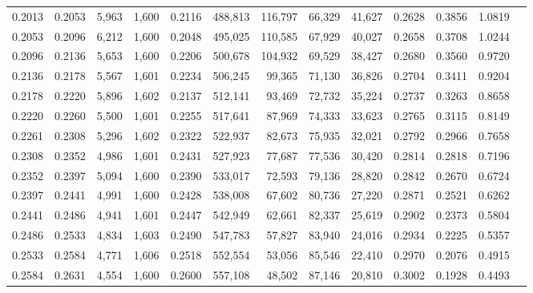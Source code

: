 \begin{tabular}{rrrrrrrrrrrrr}
0.2013 & 0.2053 &  5,963 & 1,600 &                                     0.2116 & 488,813 & 116,797 &  66,329 &  41,627 & 0.2628 & 0.3856 & 1.0819 \\
0.2053 & 0.2096 &  6,212 & 1,600 &                                     0.2048 & 495,025 & 110,585 &  67,929 &  40,027 & 0.2658 & 0.3708 & 1.0244 \\
0.2096 & 0.2136 &  5,653 & 1,600 &                                     0.2206 & 500,678 & 104,932 &  69,529 &  38,427 & 0.2680 & 0.3560 & 0.9720 \\
0.2136 & 0.2178 &  5,567 & 1,601 &                                     0.2234 & 506,245 &  99,365 &  71,130 &  36,826 & 0.2704 & 0.3411 & 0.9204 \\
0.2178 & 0.2220 &  5,896 & 1,602 &                                     0.2137 & 512,141 &  93,469 &  72,732 &  35,224 & 0.2737 & 0.3263 & 0.8658 \\
0.2220 & 0.2260 &  5,500 & 1,601 &                                     0.2255 & 517,641 &  87,969 &  74,333 &  33,623 & 0.2765 & 0.3115 & 0.8149 \\
0.2261 & 0.2308 &  5,296 & 1,602 &                                     0.2322 & 522,937 &  82,673 &  75,935 &  32,021 & 0.2792 & 0.2966 & 0.7658 \\
0.2308 & 0.2352 &  4,986 & 1,601 &                                     0.2431 & 527,923 &  77,687 &  77,536 &  30,420 & 0.2814 & 0.2818 & 0.7196 \\
0.2352 & 0.2397 &  5,094 & 1,600 &                                     0.2390 & 533,017 &  72,593 &  79,136 &  28,820 & 0.2842 & 0.2670 & 0.6724 \\
0.2397 & 0.2441 &  4,991 & 1,600 &                                     0.2428 & 538,008 &  67,602 &  80,736 &  27,220 & 0.2871 & 0.2521 & 0.6262 \\
0.2441 & 0.2486 &  4,941 & 1,601 &                                     0.2447 & 542,949 &  62,661 &  82,337 &  25,619 & 0.2902 & 0.2373 & 0.5804 \\
0.2486 & 0.2533 &  4,834 & 1,603 &                                     0.2490 & 547,783 &  57,827 &  83,940 &  24,016 & 0.2934 & 0.2225 & 0.5357 \\
0.2533 & 0.2584 &  4,771 & 1,606 &                                     0.2518 & 552,554 &  53,056 &  85,546 &  22,410 & 0.2970 & 0.2076 & 0.4915 \\
0.2584 & 0.2631 &  4,554 & 1,600 &                                     0.2600 & 557,108 &  48,502 &  87,146 &  20,810 & 0.3002 & 0.1928 & 0.4493 \\

\end{tabular}
